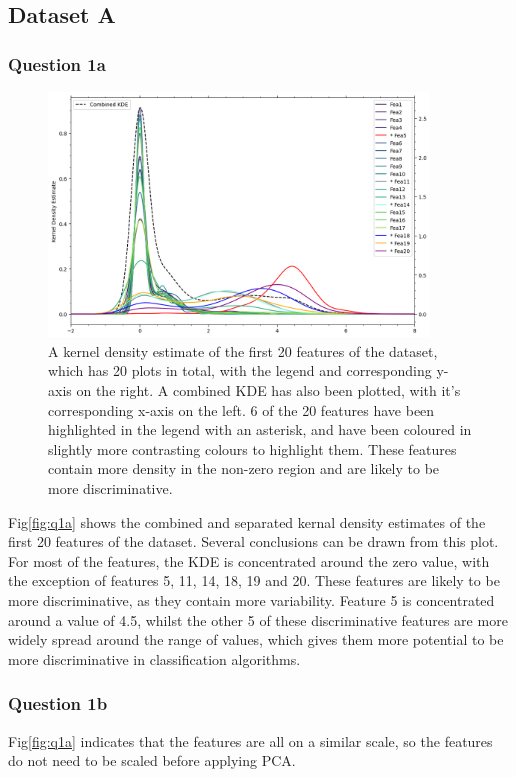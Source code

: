 
\subsection{Dataset A}\label{subsec:dataset-a}
\subsubsection{Question 1a}\label{subsubsec:q1a}
    \begin{figure}[htb]
    \centering
    \includegraphics[width=0.9\textwidth]{./figures/q1a}
    \caption{A kernel density estimate of the first 20 features of the dataset, which has 20 plots in total, with the
    legend and corresponding y-axis on the right. A combined KDE has also been plotted, with it's corresponding x-axis
    on the left. 6 of the 20 features have been highlighted in the legend with an asterisk, and have been coloured in
    slightly more contrasting colours to highlight them. These features contain more density in the non-zero region
    and are likely to be more discriminative.}
    \label{fig:q1a}
    \end{figure}

    Fig\eqref{fig:q1a} shows the combined and separated kernal density estimates of the first 20 features of the dataset.
    Several conclusions can be drawn from this plot.
    For most of the features, the KDE is concentrated around the zero value, with the exception of features 5, 11, 14,
    18, 19 and 20.
    These features are likely to be more discriminative, as they contain more variability.
    Feature 5 is concentrated around a value of 4.5, whilst the other 5 of these discriminative features are more widely
    spread around the range of values, which gives them more potential to be more discriminative in classification
    algorithms.

\subsubsection{Question 1b}\label{subsubsec:q1b}
    Fig\eqref{fig:q1a} indicates that the features are all on a similar scale, so the features do not need to be scaled
    before applying PCA.
